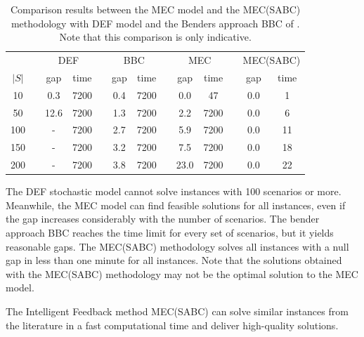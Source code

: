 \begin{table}
    \centering
    \begin{tabular}{ccccccccccccc}
\hline
 &
   &
  \multicolumn{2}{c}{ DEF} &
   &
 \multicolumn{2}{c}{BBC}  &
   &
  \multicolumn{2}{c}{MEC } &
   &
  \multicolumn{2}{c}{MEC(SABC) } \\ %
$|S|$ &
   &
    gap  & time &
   &
     gap  & time &
   &
   gap  &
  time  &
   &
    gap   &
    time   \\ \hline
10  &  & 0.3  &7200     &        & 0.4   &7200     &  & 0.0  & 47   &  & 0.0 & 1  \\
50  &  & 12.6  &7200     &        & 1.3    &7200   &  & 2.2  & 7200 &  & 0.0 & 6  \\
100 &  & -    &7200      &        & 2.7 &7200      &  & 5.9  & 7200 &  & 0.0 & 11 \\
150 &  & -  &7200        &        & 3.2   &7200    &  & 7.5  & 7200 &  & 0.0 & 18 \\
200 &  & - &7200         &        & 3.8   &7200    &  & 23.0 & 7200 &  & 0.0 & 22 \\ \hline
\end{tabular}
    \caption{Comparison results between the MEC model and the MEC(SABC) methodology with DEF model and the Benders approach BBC of \cite{yoon2021stochastic}. Note that this comparison is only indicative.}
    \label{tab:yoon}
\end{table}

The DEF stochastic model cannot solve instances with 100 scenarios or more. Meanwhile, the MEC model can find feasible solutions for all instances, even if the gap increases considerably with the number of scenarios. The bender approach BBC reaches the time limit for every set of scenarios, but it yields reasonable gaps. The MEC(SABC) methodology solves all instances with a null gap in less than one minute for all instances. Note that the solutions obtained with the MEC(SABC) methodology may not be the optimal solution to the MEC model.%

The Intelligent Feedback method MEC(SABC) can solve similar instances from the literature in a fast computational time and deliver high-quality solutions. 


